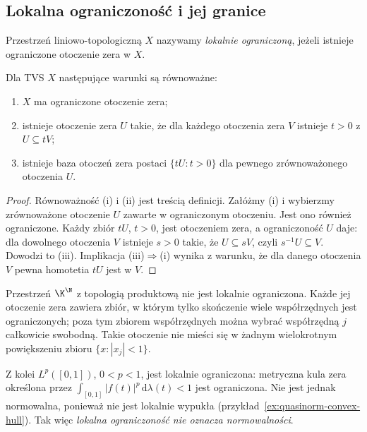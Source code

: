 \subsection{Lokalna ograniczoność i jej granice}

\begin{definicja}
Przestrzeń liniowo-topologiczną $X$ nazywamy
\emph{lokalnie ograniczoną}, jeżeli istnieje ograniczone
otoczenie zera w $X$.
\end{definicja}

\begin{stwierdzenie}
\label{prop:locally-bounded}
Dla TVS $X$ następujące warunki są równoważne:
\begin{enumerate}[label=\textup{(\roman*)}]
\item $X$ ma ograniczone otoczenie zera;
\item istnieje otoczenie zera $U$ takie, że dla każdego
otoczenia zera $V$ istnieje $t>0$ z $U\subseteq tV$;
\item istnieje baza otoczeń zera postaci $\{tU:t>0\}$
dla pewnego zrównoważonego otoczenia $U$.
\end{enumerate}
\end{stwierdzenie}
\begin{proof}
Równoważność (i) i (ii) jest treścią definicji.
Załóżmy (i) i wybierzmy zrównoważone otoczenie
$U$ zawarte w ograniczonym otoczeniu. Jest ono również
ograniczone. Każdy zbiór $tU$, $t>0$, jest otoczeniem
zera, a ograniczoność $U$ daje: dla dowolnego otoczenia
$V$ istnieje $s>0$ takie, że $U\subseteq sV$, czyli
$s^{-1}U\subseteq V$. Dowodzi to (iii).
Implikacja (iii)$\Rightarrow$(i) wynika z warunku, że
dla danego otoczenia $V$ pewna homotetia $tU$ jest w $V$.
\end{proof}

\begin{przyklad}
Przestrzeń $\K^{\N}$ z topologią produktową nie jest
lokalnie ograniczona. Każde jej otoczenie zera zawiera
zbiór, w którym tylko skończenie wiele współrzędnych jest
ograniczonych; poza tym zbiorem współrzędnych można wybrać
współrzędną $j$ całkowicie swobodną. Takie otoczenie nie
mieści się w żadnym wielokrotnym powiększeniu zbioru
$\{x:|x_j|<1\}$.

Z kolei $L^p([0,1])$, $0<p<1$, jest lokalnie ograniczona:
metryczna kula zera określona przez
$\int_{[0,1]}|f(t)|^p\,\mathrm d\lambda(t)<1$ jest ograniczona.
Nie jest jednak normowalna, ponieważ nie jest lokalnie
wypukła (przykład~\ref{ex:quasinorm-convex-hull}).
Tak więc \emph{lokalna ograniczoność nie oznacza normowalności}.
\end{przyklad}

